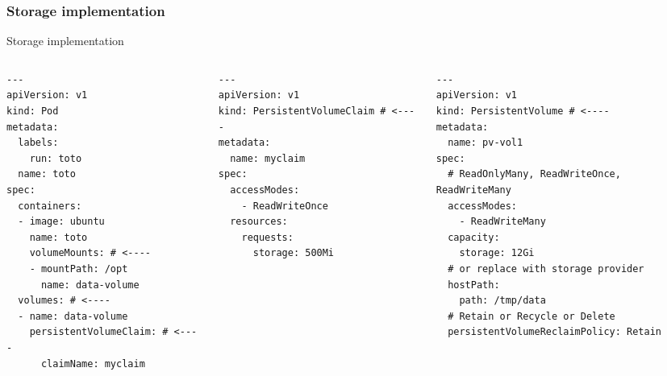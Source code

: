 \subsubsection{Storage implementation}
\begin{frame}[fragile]{Storage implementation}
\begin{small}
\begin{columns}
  \begin{column}{0.33\linewidth}
    \begin{lstlisting}
---
apiVersion: v1
kind: Pod
metadata:
  labels:
    run: toto
  name: toto
spec:
  containers:
  - image: ubuntu
    name: toto
    volumeMounts: # <----
    - mountPath: /opt
      name: data-volume
  volumes: # <----
  - name: data-volume
    persistentVolumeClaim: # <----
      claimName: myclaim
    \end{lstlisting}
  \end{column}

  \begin{column}{0.33\linewidth}
    \begin{lstlisting}
---
apiVersion: v1
kind: PersistentVolumeClaim # <----
metadata:
  name: myclaim
spec:
  accessModes:
    - ReadWriteOnce
  resources:
    requests:
      storage: 500Mi
    \end{lstlisting}
  \end{column}

  \begin{column}{0.33\linewidth}
    \begin{lstlisting}
---
apiVersion: v1
kind: PersistentVolume # <----
metadata:
  name: pv-vol1
spec:
  # ReadOnlyMany, ReadWriteOnce, ReadWriteMany
  accessModes:
    - ReadWriteMany
  capacity:
    storage: 12Gi
  # or replace with storage provider
  hostPath:
    path: /tmp/data
  # Retain or Recycle or Delete
  persistentVolumeReclaimPolicy: Retain
      \end{lstlisting}
  \end{column}
\end{columns}
\end{small}
\end{frame}
